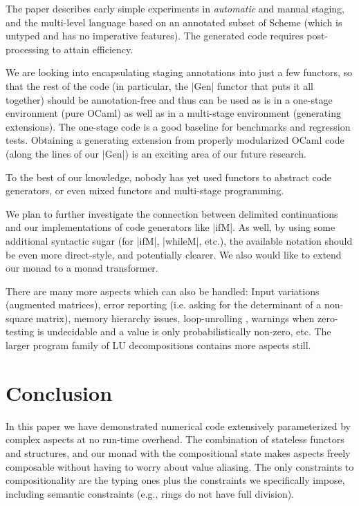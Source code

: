 \documentclass[draft]{elsart}
\begin{document}
The paper \cite{GluckJ97} describes early simple experiments in
\emph{automatic} and manual staging, and the multi-level language
based on an annotated subset of Scheme (which is untyped and has no
imperative features). The generated code requires post-processing to
attain efficiency.  

We are looking into encapsulating staging
annotations into just a few functors, so that the rest of the code (in
particular, the |Gen| functor that puts it all together) should be
annotation-free and thus can be used as is in a one-stage environment
(pure OCaml) as well as in a multi-stage environment (generating
extensions). The one-stage code is a good baseline for benchmarks and
regression tests. Obtaining a generating extension from properly
modularized OCaml code (along the lines of our |Gen|) is an exciting
area of our future research.

To the best of our knowledge, nobody has yet used functors to
abstract code generators, or even mixed functors and 
multi-stage programming.

We plan to further investigate the connection between delimited
continuations and our implementations of code generators like
|ifM|.  As well, by using some additional syntactic sugar
(for |ifM|, |whileM|, etc.), the available notation should be
even more direct-style, and potentially clearer.
We also would like to extend our monad to a monad transformer.

There are many more aspects which can also be handled:
Input variations (augmented
matrices), error reporting (i.e. asking for the determinant of a 
non-square matrix), memory hierarchy issues, loop-unrolling
\cite{Padua:MetaOcaml:04},
warnings when zero-testing is undecidable and
a value is only probabilistically non-zero, etc.  The larger program
family of LU decompositions contains more aspects still.

\section{Conclusion}\label{conclusion}
In this paper we have demonstrated numerical code extensively parameterized
by complex aspects at no run-time overhead.  The combination of
stateless functors and structures, and our monad with the
compositional state makes aspects freely composable without having to
worry about value aliasing. The only constraints to compositionality
are the typing ones plus the constraints we specifically
impose, including semantic constraints (e.g., rings do not have full
division).
\end{document}
